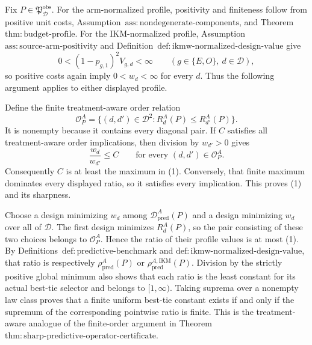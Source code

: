 Fix \(P\in\mathfrak P_{\mathcal D}^{\mathrm{obs}}\).  For the arm-normalized profile, positivity and finiteness follow from positive unit costs, Assumption~\(\mathrm{ass{:}nondegenerate\text{-}components}\), and Theorem~\(\mathrm{thm{:}budget\text{-}profile}\).  For the IKM-normalized profile, Assumption~\(\mathrm{ass{:}source\text{-}arm\text{-}positivity}\) and Definition~\(\mathrm{def{:}ikmw\text{-}normalized\text{-}design\text{-}value}\) give
\[
 0<(1-p_{g,1})^2V_{g,d}<\infty
 \qquad(g\in\{E,O\},\ d\in\mathcal D),
\]
so positive costs again imply \(0<w_d<\infty\) for every \(d\).  Thus the following argument applies to either displayed profile.

Define the finite treatment-aware order relation
\[
 \mathcal O_P^A
 =\{(d,d')\in\mathcal D^2:R_d^A(P)\le R_{d'}^A(P)\}.
\]
It is nonempty because it contains every diagonal pair.  If \(C\) satisfies all treatment-aware order implications, then division by \(w_{d'}>0\) gives
\[
 \frac{w_d}{w_{d'}}\le C
 \qquad\text{for every }(d,d')\in\mathcal O_P^A.
\]
Consequently \(C\) is at least the maximum in (1).  Conversely, that finite maximum dominates every displayed ratio, so it satisfies every implication.  This proves (1) and its sharpness.

Choose a design minimizing \(w_d\) among \(\mathcal D_{\mathrm{pred}}^A(P)\) and a design minimizing \(w_d\) over all of \(\mathcal D\).  The first design minimizes \(R_d^A(P)\), so the pair consisting of these two choices belongs to \(\mathcal O_P^A\).  Hence the ratio of their profile values is at most (1).  By Definitions~\(\mathrm{def{:}predictive\text{-}benchmark}\) and \(\mathrm{def{:}ikmw\text{-}normalized\text{-}design\text{-}value}\), that ratio is respectively \(\rho_{\mathrm{pred}}^A(P)\) or \(\rho_{\mathrm{pred}}^{A,\mathrm{IKM}}(P)\).  Division by the strictly positive global minimum also shows that each ratio is the least constant for its actual best-tie selector and belongs to \([1,\infty)\).  Taking suprema over a nonempty law class proves that a finite uniform best-tie constant exists if and only if the supremum of the corresponding pointwise ratio is finite.  This is the treatment-aware analogue of the finite-order argument in Theorem~\(\mathrm{thm{:}sharp\text{-}predictive\text{-}operator\text{-}certificate}\).

